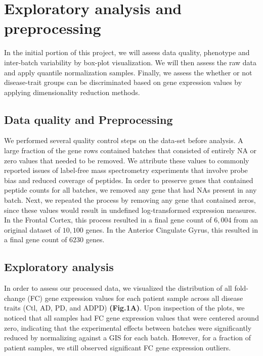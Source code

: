 \section{Exploratory analysis and preprocessing}
\label{sec:expl-analys-prepr}

 In the initial portion of this project, we will assess data quality, phenotype and  inter-batch variability by box-plot visualization. We will then assess the raw data and apply quantile normalization samples. Finally, we assess the whether or not disease-trait groups can be discriminated based on gene expression values by applying dimensionality reduction methods. 

\subsection{Data quality and Preprocessing}
\label{subsec:data-qual-vari}

We performed several quality control steps on the data-set before analysis. A large fraction of the gene rows contained batches that consisted of entirely NA or zero values that needed to be removed. We attribute these values to commonly reported issues of label-free mass spectrometry experiments that involve probe bias and reduced coverage of peptides. In order to preserve genes that contained peptide counts for all batches, we removed any gene that had NAs present in any batch. Next, we repeated the process by removing any gene that contained zeros, since these values would result in undefined log-transformed expression measures. In the Frontal Cortex, this process resulted in a final gene count of $6,004$ from an original dataset of $10,100$ genes. In the Anterior Cingulate Gyrus, this resulted in a final gene count of $6230$ genes. 

\subsection{Exploratory analysis}
\label{subsec:exploratory-analysis}

In order to assess our processed data, we visualized the distribution of all fold-change (FC) gene expression values for each patient sample across all disease traits (Ctl, AD, PD, and ADPD) \textbf{ (Fig.1A)}. Upon inspection of the plots, we noticed that all samples had FC gene expression values that were centered around zero, indicating that the experimental effects between batches were significantly reduced by normalizing against a GIS for each batch. However, for a fraction of patient samples, we still observed significant FC gene expression outliers. 

